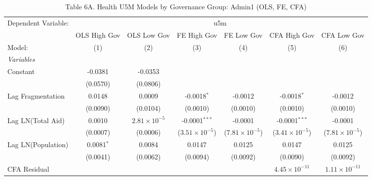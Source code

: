 \begin{table}[htbp]
   \caption{Table 6A. Health U5M Models by Governance Group: Admin1 (OLS, FE, CFA)}
   \centering
   \begin{tabular}{lcccccc}
      \tabularnewline \midrule \midrule
      Dependent Variable: & \multicolumn{6}{c}{u5m}\\
                         & OLS High Gov & OLS Low Gov           & FE High Gov             & FE Low Gov              & CFA High Gov             & CFA Low Gov \\   
      Model:             & (1)          & (2)                   & (3)                     & (4)                     & (5)                      & (6)\\  
      \midrule
      \emph{Variables}\\
      Constant           & -0.0381      & -0.0353               &                         &                         &                          &   \\   
                         & (0.0570)     & (0.0806)              &                         &                         &                          &   \\   
      Lag Fragmentation  & 0.0148       & 0.0009                & -0.0018$^{*}$           & -0.0012                 & -0.0018$^{*}$            & -0.0012\\   
                         & (0.0090)     & (0.0104)              & (0.0010)                & (0.0010)                & (0.0010)                 & (0.0010)\\   
      Lag LN(Total Aid)  & 0.0010       & $2.81\times 10^{-5}$  & -0.0001$^{***}$         & -0.0001                 & -0.0001$^{***}$          & -0.0001\\   
                         & (0.0007)     & (0.0006)              & ($3.51\times 10^{-5}$)  & ($7.81\times 10^{-5}$)  & ($3.41\times 10^{-5}$)   & ($7.81\times 10^{-5}$)\\    
      Lag LN(Population) & 0.0081$^{*}$ & 0.0084                & 0.0147                  & 0.0125                  & 0.0147                   & 0.0125\\   
                         & (0.0041)     & (0.0062)              & (0.0094)                & (0.0092)                & (0.0090)                 & (0.0092)\\   
      CFA Residual       &              &                       &                         &                         & $4.45\times 10^{-11}$    & $1.11\times 10^{-11}$\\    

\end{tabular}
\end{table}

